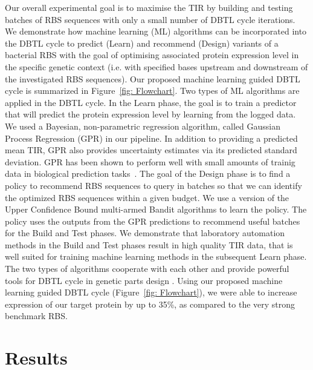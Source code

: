\documentclass{scrartcl}[2013/05/29]%
\newcommand{\maciej}[1]{\textcolor{blue}{#1}}
\begin{document}
Our overall experimental goal is to maximise the TIR by building and testing batches of RBS sequences with only a small number of DBTL cycle iterations.
We demonstrate how machine learning (ML) algorithms can be incorporated
into the DBTL cycle to predict (Learn) and recommend (Design) variants
of a bacterial RBS with the goal of optimising associated protein expression
level in the specific genetic context
(i.e. with specified bases upstream and downstream of the investigated RBS sequences).
Our proposed machine learning guided DBTL cycle is summarized in Figure~\ref{fig: Flowchart}.
Two types of ML algorithms are applied in the DBTL cycle.
In the Learn phase, the goal is to train a predictor that will predict the protein expression level by learning from the logged data.
We used a Bayesian, non-parametric regression algorithm, called Gaussian Process Regression (GPR) \cite{Rasmussen2004} in our pipeline.
In addition to providing a predicted mean TIR, GPR also provides uncertainty estimates via its predicted standard deviation.
GPR has been shown to  perform well with small amounts of trainig data in biological prediction tasks~\cite{Rasmussen2004, desautels2014parallelizing}.
The goal of the Design phase is to find a policy to recommend RBS sequences to query in batches so that we can identify the optimized RBS sequences within a given budget.
We use a version of the Upper Confidence Bound multi-armed Bandit algorithms \cite{desautels2014parallelizing} to learn the policy.
The policy uses the outputs from the GPR predictions to recommend useful batches for the Build and Test phases.
We demonstrate that laboratory automation methods in the Build and Test phases result in high quality TIR data, that is well suited for training machine learning methods in the subsequent Learn phase.
The two types of algorithms cooperate with each other and provide powerful tools for DBTL cycle in genetic parts design \cite{srinivas2012information, desautels2014parallelizing}.
Using our proposed machine learning guided DBTL cycle
(Figure~\ref{fig: Flowchart}), we were able to increase expression of our
target protein by up to 35\%, as compared to the very strong benchmark RBS. \\


\section{Results}
\end{document}
